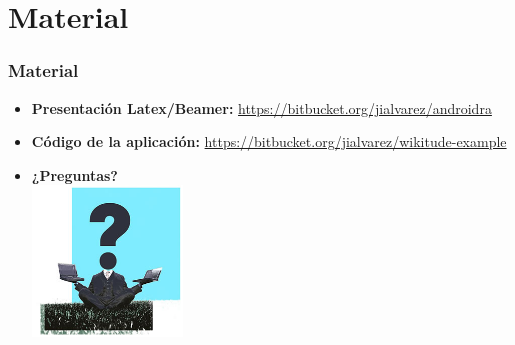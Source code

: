 \section{Material}
\frame
{
\frametitle{Material}
\begin{itemize}
 \item \textbf{Presentación Latex/Beamer:} \url{https://bitbucket.org/jialvarez/androidra}
 \item \textbf{Código de la aplicación:} \url{https://bitbucket.org/jialvarez/wikitude-example}
 \item \textbf{¿Preguntas?}\\
 \centering\includegraphics[height=4cm]{imgs/preguntas.jpg}
\end{itemize}
}
